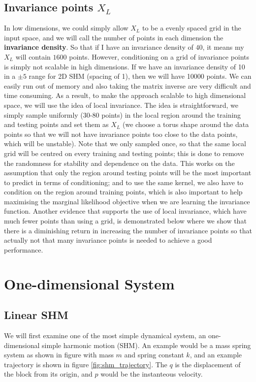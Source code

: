 \documentclass{statsmsc}
\begin{document}
\subsection*{Invariance points $X_L$}
In low dimensions, we could simply allow $X_L$ to be a evenly spaced grid in the input space, and we will call the number of points in each dimension the \textbf{invariance density}.
So that if I have an invariance density of $40$, it means my $X_L$ will contain $1600$ points. 
However, conditioning on a grid of invariance points is simply not scalable in high dimensions. 
If we have an invariance density of 10 in a $\pm 5$ range for 2D SHM (spacing of 1), then we will have 10000 points. 
We can easily run out of memory and also taking the matrix inverse are very difficult and time consuming.
As a result, to make the approach scalable to high dimensional space, we will use the idea of local invariance. 
The idea is straightforward, we simply sample uniformly (30-80 points) in the local region around the training and testing points and set them as $X_L$ (we choose a torus shape around the data points so that we will not have invariance points too close to the data points, which will be unstable).
Note that we only sampled once, so that the same local grid will be centred on every training and testing points; this is done to remove the randomness for stability and dependence on the data.
This works on the assumption that only the region around testing points will be the most important to predict in terms of conditioning; and to use the same kernel, we also have to condition on the region around training points, which is also important to help maximising the marginal likelihood objective when we are learning the invariance function.
Another evidence that supports the use of local invariance, which have much fewer points than using a grid, is demonstrated below where we show that there is a diminishing return in increasing the number of invariance points so that actually not that many invariance points is needed to achieve a good performance. 

\section{One-dimensional System}
\subsection{Linear SHM}
We will first examine one of the most simple dynamical system, an one-dimensional simple harmonic motion (SHM). 
An example would be a mass spring system as shown in figure with mass $m$ and spring constant $k$, and an example trajectory is shown in figure \ref{fig:shm_trajectory}. 
The $q$ is the displacement of the block from its origin, and $p$ would be the instanteous velocity.
\end{document}
